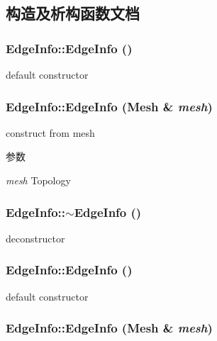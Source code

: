 \subsection{构造及析构函数文档}
\hypertarget{classEdgeInfo_ace4f72439ec4a9937fa5fb022233e1eb}{
\subsubsection[{EdgeInfo}]{\setlength{\rightskip}{0pt plus 5cm}EdgeInfo::EdgeInfo ()}}
\label{classEdgeInfo_ace4f72439ec4a9937fa5fb022233e1eb}


default constructor \hypertarget{classEdgeInfo_a8b2da33bbc88974d1bbbb2e9a330c819}{
\subsubsection[{EdgeInfo}]{\setlength{\rightskip}{0pt plus 5cm}EdgeInfo::EdgeInfo (Mesh \& {\em mesh})}}
\label{classEdgeInfo_a8b2da33bbc88974d1bbbb2e9a330c819}


construct from mesh 
\begin{DoxyParams}{参数}
\item[{\em mesh}]Topology \end{DoxyParams}
\hypertarget{classEdgeInfo_ac1563ffa6c9641e5510503aa2e46f7a1}{
\subsubsection[{$\sim$EdgeInfo}]{\setlength{\rightskip}{0pt plus 5cm}EdgeInfo::$\sim$EdgeInfo ()}}
\label{classEdgeInfo_ac1563ffa6c9641e5510503aa2e46f7a1}


deconstructor \hypertarget{classEdgeInfo_ace4f72439ec4a9937fa5fb022233e1eb}{
\subsubsection[{EdgeInfo}]{\setlength{\rightskip}{0pt plus 5cm}EdgeInfo::EdgeInfo ()}}
\label{classEdgeInfo_ace4f72439ec4a9937fa5fb022233e1eb}


default constructor \hypertarget{classEdgeInfo_a8b2da33bbc88974d1bbbb2e9a330c819}{
\subsubsection[{EdgeInfo}]{\setlength{\rightskip}{0pt plus 5cm}EdgeInfo::EdgeInfo (Mesh \& {\em mesh})}}
\label{classEdgeInfo_a8b2da33bbc88974d1bbbb2e9a330c819}


